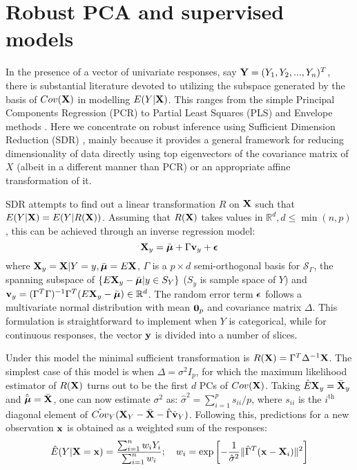 \section{Robust PCA and supervised models}

In the presence of a vector of univariate responses, say ${\mathbf{Y}} = (Y_1,Y_2,...,Y_n)^T$, there is substantial literature devoted to utilizing the subspace generated by the basis of $Cov({\mathbf{X}})$ in modelling $E(Y|{\mathbf{X}})$. This ranges from the simple Principal Components Regression (PCR) to Partial Least Squares (PLS) and Envelope methods \citep{Cook10}. Here we concentrate on robust inference using Sufficient Dimension Reduction (SDR) \citep{AdragniCook09}, mainly because it provides a general framework for reducing dimensionality of data directly using top eigenvectors of the covariance matrix of $X$ (albeit in a different manner than PCR) or an appropriate affine transformation of it.

SDR attempts to find out a linear transformation $R$ on ${\mathbf{X}}$ such that $E(Y|{\mathbf{X}}) = E(Y|R({\mathbf{X}}))$. Assuming that $R({\mathbf{X}})$ takes values in $\mathbb R^d, d \leq \min(n,p)$, this can be achieved through an inverse regression model:
%
\begin{equation}
{\mathbf{X}}_y = \bar {{\boldsymbol{\mu}}} + \Gamma {\bf{v}}_y + {\boldsymbol{\epsilon}}
\end{equation}
%
where ${\mathbf{X}}_y = {\mathbf{X}}|Y=y, \bar{{\boldsymbol{\mu}}} = E{\mathbf{X}}$, $\Gamma$ is a $p \times d$ semi-orthogonal basis for $\mathcal S_\Gamma$, the spanning subspace of $\{ E {\mathbf{X}}_y - \bar{{\boldsymbol{\mu}}} | y \in S _Y \}$ ($S_y$ is sample space of $Y$) and ${\bf{v}}_y = (\Gamma^T \Gamma)^{-1} \Gamma^T (E {\mathbf{X}}_y - \bar{{\boldsymbol{\mu}}}) \in \mathbb R^d$. The random error term ${\boldsymbol{\epsilon}}$ follows a multivariate normal distribution with mean ${\bf 0}_p$ and covariance matrix $\Delta$. This formulation is straightforward to implement when $Y$ is categorical, while for continuous responses, the vector ${\bf{y}}$ is divided into a number of slices.

Under this model the minimal sufficient transformation is $R({\mathbf{X}}) = \Gamma^T \Delta^{-1} {\mathbf{X}}$. The simplest case of this model is when $\Delta = \sigma^2 I_p$, for which the maximum likelihood estimator of $ R({\mathbf{X}})$ turns out to be the first $d$ PCs of $Cov({\mathbf{X}})$. Taking $\hat E{\mathbf{X}}_y = \bar{{\mathbf{X}}}_y$ and $\hat{\bar{{\boldsymbol{\mu}}}} = \bar{{\mathbf{X}}}$, one can now estimate $\sigma^2$ as: $\hat\sigma^2 = \sum_{i=1}^p s_{ii}/p$, where $s_{ii}$ is the $i^\text{th}$ diagonal element of $\hat{Cov}_Y( {\mathbf{X}}_Y - \bar{{\mathbf{X}}} - \hat\Gamma \hat{{\bf{v}}}_Y)$. Following this, predictions for a new observation ${\bf{x}}$ is obtained as a weighted sum of the responses:
%
$$
\hat E(Y|{\mathbf{X}}={\bf{x}}) = \frac{\sum_{i=1}^n w_i Y_i}{\sum_{i=1}^n w_i}; \quad w_i = \exp \left[ -\frac{1}{\hat\sigma^2}  \| \hat\Gamma^T ({\bf{x}} - {\mathbf{X}}_i) \|^2 \right]
$$
%

